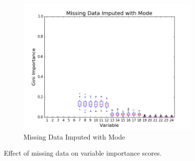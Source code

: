 \begin{figure}[h!]
\begin{subfigure}[b]{0.45\textwidth}
    \includegraphics[width=\textwidth]{figures/random_forests/rf_missing_data_imputed_mode}
    \caption{Missing Data Imputed with Mode}
    \label{fig:missing-data-imputed}
  \end{subfigure}
  \caption{Effect of missing data on variable importance scores.}
  \label{fig:missing-data}
\end{figure}

